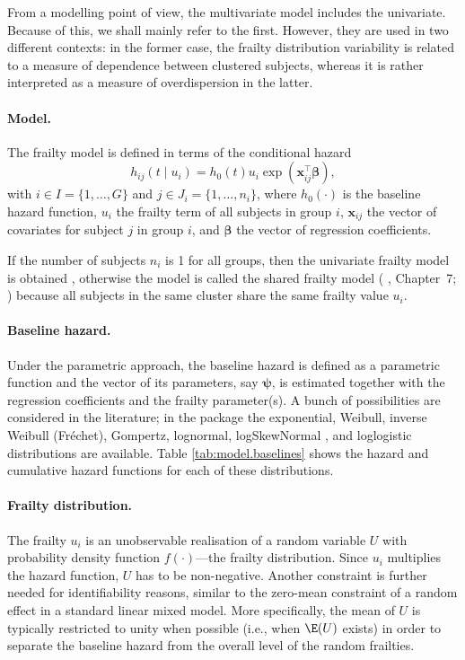 From a modelling point of view, the multivariate model includes the univariate.
Because of this, we shall mainly refer to the first.
However, they are used in two different contexts: 
	in the former case, the frailty distribution variability is related to a measure of dependence between clustered subjects,
	whereas it is rather interpreted as a measure of overdispersion in the latter.

\paragraph{Model.}
The frailty model is defined in terms of the conditional hazard 
\begin{equation*}
  h_{ij}(t \mid u_i) = h_0(t) u_i \exp{(\bm{x}_{ij}^\top \bm\beta)},
\end{equation*}
with  $i \in I = \{ 1, \ldots, G \}$ and $j \in J_{i} = \{ 1, \ldots, n_i \}$, where
      $h_0( \cdot )$ is the baseline hazard function,
      $u_i$ the frailty term of all subjects in group $i$,
      $\bm{x}_{ij}$ the vector of covariates for subject $j$ in group $i$, and
      $\bm\beta$ the vector of regression coefficients.

If the number of subjects $n_i$ is 1 for all groups, then the univariate frailty model is obtained
  \cite[Chapter~3]{Wienke10},
otherwise the model is called the {shared} frailty model (\citeauthor{Hougaard00} \citeyear{Hougaard00}, Chapter~7; \citeauthor{DuchateauJanssen08} \citeyear{DuchateauJanssen08})
  because all subjects in the same cluster share the same frailty value $u_i$.


\paragraph{Baseline hazard.}
Under the parametric approach, the baseline hazard is defined as a parametric
  function and the vector of its parameters, say $\bm{\psi}$,
  is estimated together with the regression coefficients and the frailty parameter(s).
A bunch of possibilities are considered in the literature;
in the  package the
  exponential,
  Weibull,
  inverse Weibull (Fr\'echet),
  Gompertz,
  lognormal, 
  logSkewNormal \citep{Azzalini85}, and
  loglogistic
  distributions are available.
Table \ref{tab:model.baselines} shows the hazard and cumulative hazard functions for each of these distributions.

  


\paragraph{Frailty distribution.}
The frailty $u_i$ is an unobservable realisation of a random variable $U$
  with probability density function $f(\cdot)$---the frailty distribution.
Since $u_i$ multiplies the hazard function, $U$ has to be non-negative.
Another constraint is further needed for identifiability reasons,
  similar to the zero-mean constraint of a random effect in a standard linear mixed model.
More specifically, the mean of $U$ is typically restricted to unity when possible (i.e., when $\E(U)$ exists)
in order to separate the baseline hazard from the overall level of the random frailties.


